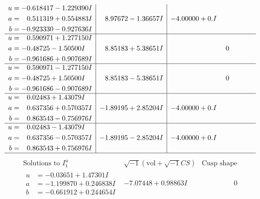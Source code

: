 \documentclass[1p]{elsarticle_modified}
\theoremstyle{definition}
\newcommand{\I}{\sqrt{-1}}
\begin{document}
$$\begin{array}{c|c|c}
\begin{aligned}
u &= -0.618417 - 1.229390 I \\
a &= \phantom{-}0.511319 + 0.554883 I \\
b &= -0.923330 - 0.927636 I\end{aligned}
 & \phantom{-}8.97672 - 1.36657 I & -4.00000 + 0. I\phantom{ +0.000000I} \\ \hline\begin{aligned}
u &= \phantom{-}0.590971 + 1.277150 I \\
a &= -0.48725 - 1.50500 I \\
b &= -0.961686 + 0.907689 I\end{aligned}
 & \phantom{-}8.85183 + 5.38651 I & \phantom{-0.000000 } 0 \\ \hline\begin{aligned}
u &= \phantom{-}0.590971 - 1.277150 I \\
a &= -0.48725 + 1.50500 I \\
b &= -0.961686 - 0.907689 I\end{aligned}
 & \phantom{-}8.85183 - 5.38651 I & \phantom{-0.000000 } 0 \\ \hline\begin{aligned}
u &= \phantom{-}0.02483 + 1.43079 I \\
a &= \phantom{-}0.637356 + 0.570357 I \\
b &= \phantom{-}0.863543 - 0.756976 I\end{aligned}
 & -1.89195 + 2.85204 I & -4.00000 + 0. I\phantom{ +0.000000I} \\ \hline\begin{aligned}
u &= \phantom{-}0.02483 - 1.43079 I \\
a &= \phantom{-}0.637356 - 0.570357 I \\
b &= \phantom{-}0.863543 + 0.756976 I\end{aligned}
 & -1.89195 - 2.85204 I & -4.00000 + 0. I\phantom{ +0.000000I}\\
 \hline 
 \end{array}$$\newpage$$\begin{array}{c|c|c}  
\text{Solutions to }I^u_{1}& \I (\text{vol} + \sqrt{-1}CS) & \text{Cusp shape}\\
 \hline 
\begin{aligned}
u &= -0.03651 + 1.47301 I \\
a &= -1.199870 + 0.246838 I \\
b &= -0.661912 + 0.244654 I\end{aligned}
 & -7.07448 + 0.98863 I & \phantom{-0.000000 } 0 \\ \hline\begin{aligned}

\end{aligned}
\end{array}$$
\end{document}
